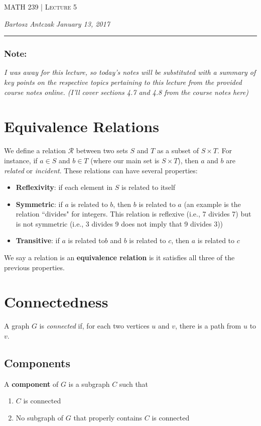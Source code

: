 \documentclass{report}
\newcommand{\lectureNum}{5}
\newcommand{\curDate}{January 13, 2017}
\newcommand{\course}{MATH 239}
\begin{document}
\begin{center}
\begin{Large}
\textsc{\course{} | Lecture \lectureNum{}}
\end{Large}
\end{center} 
\noindent \textit{Bartosz Antczak} \hfill
\textit{\curDate{}}
\rule{\textwidth}{0.4pt}

\subsubsection{Note:}
\begin{center}
\textit{I was away for this lecture, so today's notes will be substituted with a summary of key points on the respective topics pertaining to this lecture from the provided course notes online. (I'll cover sections 4.7 and 4.8 from the course notes here)}
\end{center}
\section{Equivalence Relations}
We define a relation $\mathscr{R}$ between two sets $S$ and $T$ as a subset of $S \times T$. For instance, if $a \in S$ and $b \in T$ (where our main set is $S \times T$), then $a$ and $b$ are \textit{related} or \textit{incident}. These relations can have several properties:
\begin{itemize}
\item \textbf{Reflexivity}: if each element in $S$ is related to itself
\item \textbf{Symmetric}: if $a$ is related to $b$, then $b$ is related to $a$ (an example is the relation ``divides" for integers. This relation is reflexive (i.e., 7 divides 7) but is not symmetric (i.e., 3 divides 9 does not imply that 9 divides 3))
\item \textbf{Transitive}: if $a$ is related to$b$ and $b$ is related to $c$, then $a$ is related to $c$
\end{itemize}
We say a relation is an \textbf{equivalence relation} is it satisfies all three of the previous properties.

\section{Connectedness}
A graph $G$ is \textit{connected} if, for each two vertices $u$ and $v$, there is a path from $u$ to $v$.
\subsection{Components}
A \textbf{component} of $G$ is a subgraph $C$ such that
\begin{enumerate}
\item $C$ is connected
\item No subgraph of $G$ that properly contains $C$ is connected
\end{enumerate}
\end{document}
